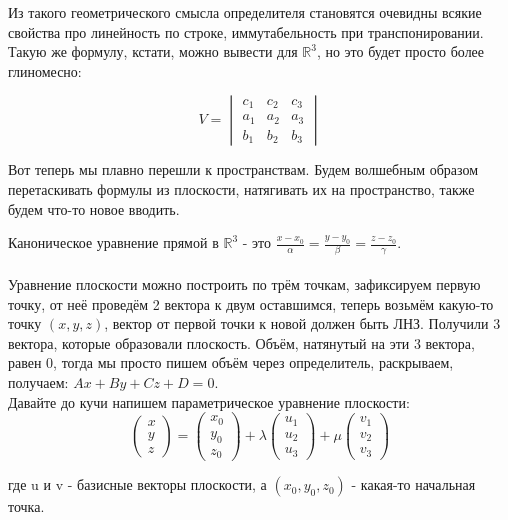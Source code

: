 \documentclass[12pt]{article}
\newcommand{\R}{\mathbb{R}}
\begin{document}
\begin{remarkbox}
Из такого геометрического смысла определителя становятся очевидны всякие свойства про линейность по строке, иммутабельность при транспонировании.\\

Такую же формулу, кстати, можно вывести для $\R^3$, но это будет просто более глиномесно:

\[
V = 
\begin{vmatrix}
c_1 & c_2 & c_3\\
a_1 & a_2 & a_3\\
b_1 & b_2 & b_3
\end{vmatrix}
\]
\end{remarkbox}

Вот теперь мы плавно перешли к пространствам. Будем волшебным образом перетаскивать формулы из плоскости, натягивать их на пространство, также будем что-то новое вводить.\\

\begin{remarkbox}
Каноническое уравнение прямой в $\R^3$ - это $\frac{x - x_0}{\alpha} = \frac{y - y_0}{\beta} = \frac{z - z_0}{\gamma}$.\\\\

Уравнение плоскости можно построить по трём точкам, зафиксируем первую точку, от неё проведём 2 вектора к двум оставшимся, теперь возьмём какую-то точку $(x, y, z)$, вектор от первой точки к новой должен быть ЛНЗ. Получили 3 вектора, которые образовали плоскость. Объём, натянутый на эти 3 вектора, равен 0, тогда мы просто пишем объём через определитель, раскрываем, получаем: $Ax + By +Cz +D = 0$.\\

Давайте до кучи напишем параметрическое уравнение плоскости:
\[
\begin{pmatrix}
x \\
y \\
z
\end{pmatrix}
=
\begin{pmatrix}
x_0 \\
y_0 \\
z_0
\end{pmatrix}
+
\lambda
\begin{pmatrix}
u_1 \\
u_2 \\
u_3
\end{pmatrix}
+
\mu
\begin{pmatrix}
v_1 \\
v_2 \\
v_3
\end{pmatrix}
\]

где u и v - базисные векторы плоскости, а $(x_0, y_0, z_0)$ - какая-то начальная точка.
\end{remarkbox}
\end{document}
